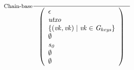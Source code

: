 \begin{figure}
  \begin{equation}
    \label{eq:rule:chain-base}
    \inference[Chain-base]
    {}
    {\left(
        \begin{array}{l}
          \epsilon\\
          \var{utxo}\\
          \var{\{ (\var{vk}, \var{vk}) \mid \var{vk} \in \Gkeys\}}\\
          \emptyset\\
          \var{s_0}\\
          \emptyset\\
          \emptyset
        \end{array}
      \right)
    }
  \end{equation}


\end{figure}
